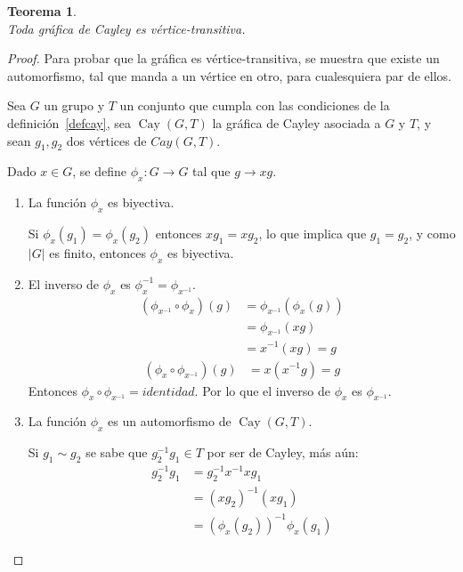 \documentclass[11pt]{book}
\newtheorem{theorem}{Teorema}
\theoremstyle{definition}
\DeclareMathOperator{\Cay}{Cay}
\begin{document}
\begin{theorem}\textbf{}\\
  Toda gráfica de Cayley es vértice-transitiva.
  \label{CayVT}
\end{theorem}

\begin{proof}
 Para probar que la gráfica es vértice-transitiva, se
muestra que existe un automorfismo, tal que manda a un vértice en
otro, para cualesquiera par de ellos.

Sea $G$ un grupo y $T$ un conjunto que cumpla con las condiciones de
la definición~\ref{defcay}, sea $\Cay(G,T)$  la gráfica de Cayley
asociada a $G$ y $T$, y sean $g_1, g_2$ dos vértices
de $Cay(G,T)$. 

Dado $x \in G$, se define $\phi_x:G \rightarrow G$ tal que $g
\rightarrow xg$.

\begin{enumerate}

\item \label{1}
La función $\phi_x$ es biyectiva.

Si $\phi_x(g_1)=\phi_x(g_2)$ entonces
$xg_1=xg_2$, lo que implica que $g_1=g_2$, y como $|G|$ es finito,
entonces $\phi_x$ es biyectiva.      

\item\label{2}
El inverso de $\phi_x$ es $\phi_x^{-1}=\phi_{x^{-1}}$.
\begin{equation*}
  \begin{split}
    (\phi_{x^{-1}}\circ \phi_x)(g)&= \phi_{x^{-1}} (\phi_x(g))\\
    &=\phi_{x^{-1}}(xg)\\
    &=x^{-1}(xg)=g
  \end{split}
\end{equation*}
\begin{equation*}
  \begin{split}
    (\phi_x \circ \phi_{x^{-1}})(g)&=x(x^{-1}g)=g
  \end{split}
\end{equation*}
Entonces $\phi_x \circ \phi_{x^{-1}}=identidad$. Por lo que el inverso
de $\phi_x$ es $\phi_{x^{-1}}$.

\item \label{3}
La función $\phi_x$ es un automorfismo de $\Cay(G,T)$. 

Si $g_1 \sim g_2$ se sabe que $g_2^{-1}g_1\in T$ por ser de Cayley, más aún:
\begin{equation*}
  \begin{split}
    g_2^{-1}g_1&=g_2^{-1}x^{-1}xg_1\\
    &=(xg_2)^{-1}(xg_1)\\
    &=(\phi_x(g_2))^{-1} \phi_x(g_1)
  \end{split}
\end{equation*}


\end{enumerate}
\end{proof}
\end{document}
